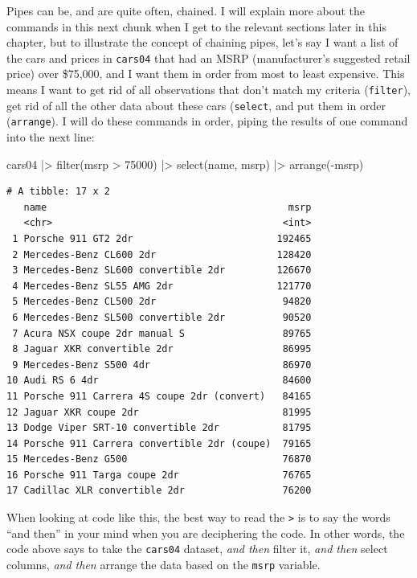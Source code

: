 \documentclass[
  letterpaper,
]{book}
\newenvironment{Shaded}{\begin{snugshade}}{\end{snugshade}}
\newcommand{\DecValTok}[1]{\textcolor[rgb]{0.68,0.00,0.00}{#1}}
\newcommand{\FunctionTok}[1]{\textcolor[rgb]{0.28,0.35,0.67}{#1}}
\newcommand{\NormalTok}[1]{\textcolor[rgb]{0.00,0.23,0.31}{#1}}
\newcommand{\SpecialCharTok}[1]{\textcolor[rgb]{0.37,0.37,0.37}{#1}}
\begin{document}
Pipes can be, and are quite often, chained. I will explain more about
the commands in this next chunk when I get to the relevant sections
later in this chapter, but to illustrate the concept of chaining pipes,
let's say I want a list of the cars and prices in \texttt{cars04} that
had an MSRP (manufacturer's suggested retail price) over \$75,000, and I
want them in order from most to least expensive. This means I want to
get rid of all observations that don't match my criteria
(\texttt{filter}), get rid of all the other data about these cars
(\texttt{select}, and put them in order (\texttt{arrange}). I will do
these commands in order, piping the results of one command into the next
line:

\begin{Shaded}
\begin{Highlighting}[]
\NormalTok{cars04 }\SpecialCharTok{|\textgreater{}} 
  \FunctionTok{filter}\NormalTok{(msrp }\SpecialCharTok{\textgreater{}} \DecValTok{75000}\NormalTok{) }\SpecialCharTok{|\textgreater{}} 
  \FunctionTok{select}\NormalTok{(name, msrp) }\SpecialCharTok{|\textgreater{}} 
  \FunctionTok{arrange}\NormalTok{(}\SpecialCharTok{{-}}\NormalTok{msrp)}
\end{Highlighting}
\end{Shaded}

\begin{verbatim}
# A tibble: 17 x 2
   name                                          msrp
   <chr>                                        <int>
 1 Porsche 911 GT2 2dr                         192465
 2 Mercedes-Benz CL600 2dr                     128420
 3 Mercedes-Benz SL600 convertible 2dr         126670
 4 Mercedes-Benz SL55 AMG 2dr                  121770
 5 Mercedes-Benz CL500 2dr                      94820
 6 Mercedes-Benz SL500 convertible 2dr          90520
 7 Acura NSX coupe 2dr manual S                 89765
 8 Jaguar XKR convertible 2dr                   86995
 9 Mercedes-Benz S500 4dr                       86970
10 Audi RS 6 4dr                                84600
11 Porsche 911 Carrera 4S coupe 2dr (convert)   84165
12 Jaguar XKR coupe 2dr                         81995
13 Dodge Viper SRT-10 convertible 2dr           81795
14 Porsche 911 Carrera convertible 2dr (coupe)  79165
15 Mercedes-Benz G500                           76870
16 Porsche 911 Targa coupe 2dr                  76765
17 Cadillac XLR convertible 2dr                 76200
\end{verbatim}

When looking at code like this, the best way to read the
\texttt{\textbar{}\textgreater{}} is to say the words ``and then'' in
your mind when you are deciphering the code. In other words, the code
above says to take the \texttt{cars04} dataset, \emph{and then} filter
it, \emph{and then} select columns, \emph{and then} arrange the data
based on the \texttt{msrp} variable.
\end{document}
